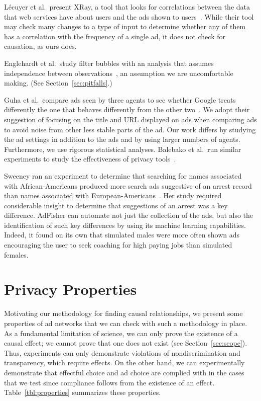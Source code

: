 \documentclass{article}
\begin{document}
L\'ecuyer et al.\ present XRay, a tool that looks for correlations between the data that web services have about users and the ads shown to users~\cite{lecuyer14usenix}.  
While their tool may check many changes to a type of input to determine whether any of them has a correlation with the frequency of a single ad, it does not check for causation, as ours does.

Englehardt et al.\ study filter bubbles with an analysis that assumes independence between observations~\cite{englehardt14man}, an assumption we are uncomfortable making.  (See Section~\ref{sec:pitfalls}.)

Guha et al.\ compare ads seen by three agents to see whether Google treats differently the one that behaves differently from the other two~\cite{guha10imc}.  We adopt their suggestion of focusing on the title and URL displayed on ads when comparing ads to avoid noise from other less stable parts of the ad.  Our work differs by studying the ad settings in addition to the ads and by using larger numbers of agents.  Furthermore, we use rigorous statistical analyses. Balebako et al.\ run similar experiments 
to study the effectiveness of privacy tools~\cite{balebako12w2sp}.

Sweeney ran an experiment to determine that searching for names associated with African-Americans produced more search ads suggestive of an arrest record than names associated with European-Americans~\cite{sweeney13cacm}.  
Her study required considerable insight to determine that suggestions of an arrest was a key difference.
AdFisher can automate not just the collection of the ads, but also the identification of such key differences by using its machine learning capabilities.  Indeed, it found on its own that simulated males were more often shown ads encouraging the user to seek coaching for high paying jobs than simulated females.
  













\section{Privacy Properties}
\label{sec:prop}

Motivating our methodology for finding causal relationships, we present some properties of ad networks that we can check with such a methodology in place.
As a fundamental limitation of science, we can only prove the existence of a causal effect; we cannot prove that one does not exist (see Section~\ref{sec:scope}).  
Thus, experiments can only demonstrate violations of nondiscrimination and transparency, which require effects.
On the other hand, we can experimentally demonstrate that effectful choice and ad choice are complied with in the cases that we test since compliance follows from the existence of an effect.
Table~\ref{tbl:properties} summarizes these properties.
\end{document}
